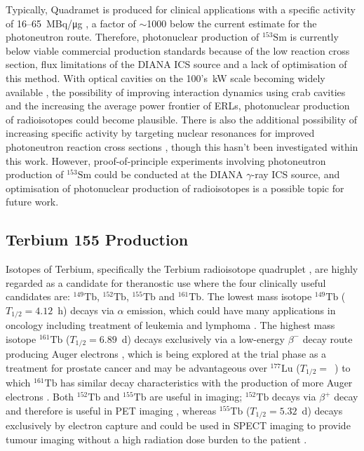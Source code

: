 \documentclass[../main.tex]{subfiles}
\begin{document}
Typically, Quadramet is produced for clinical applications with a specific activity of 16--65~\si{\mega\becquerel}/\si{\micro\gram} \cite{ema2015quadramet}, a factor of $\sim$1000 below the current estimate for the photoneutron route. Therefore, photonuclear production of $^{153}\mathrm{Sm}$ is currently below viable commercial production standards because of the low reaction cross section, flux limitations of the DIANA ICS source and a lack of optimisation of this method. With optical cavities on the 100's~\si{\kilo\watt} scale becoming widely available \cite{eggl2016munich,liu2018optical}, the possibility of improving interaction dynamics using crab cavities \cite{variola2011luminosity,koshiba2018luminosity} and the increasing the average power frontier of ERLs, photonuclear production of radioisotopes could become plausible. There is also the additional possibility of increasing specific activity by targeting nuclear resonances for improved photoneutron reaction cross sections \cite{habs2011production}, though this hasn't been investigated within this work. However, proof-of-principle experiments involving photoneutron production of $^{153}\mathrm{Sm}$ could be conducted at the DIANA $\gamma$-ray ICS source, and optimisation of photonuclear production of radioisotopes is a possible topic for future work.      

\subsection{Terbium 155 Production}
Isotopes of Terbium, specifically the Terbium radioisotope quadruplet \cite{muller2012unique}, are highly regarded as a candidate for theranostic use where the four clinically useful candidates are: $^{149}\mathrm{Tb}$, $^{152}\mathrm{Tb}$, $^{155}\mathrm{Tb}$ and $^{161}\mathrm{Tb}$. The lowest mass isotope $^{149}\mathrm{Tb}$ ($T_{1/2} = 4.12$~\si{\hour}) decays via $\alpha$ emission, which could have many applications in oncology \cite{muller2017alpha} including treatment of leukemia and lymphoma \cite{beyer2004targeted}. The highest mass isotope $^{161}\mathrm{Tb}$ ($T_{1/2} = 6.89$~\si{\day}) decays exclusively via a low-energy $\beta^{-}$ decay route producing Auger electrons \cite{muller2012unique}, which is being explored at the trial phase as a treatment for prostate cancer \cite{baum2021first,muller2019terbium} and may be advantageous over $^{177}\mathrm{Lu}$ ($T_{1/2} = $~\si{}) to which $^{161}\mathrm{Tb}$ has similar decay characteristics with the production of more Auger electrons \cite{lehenberger2011low,grunberg2014anti}. Both $^{152}\mathrm{Tb}$ and $^{155}\mathrm{Tb}$ are useful in imaging; $^{152}\mathrm{Tb}$ decays via $\beta^{+}$ decay and therefore is useful in PET imaging \cite{muller2012unique}, whereas $^{155}\mathrm{Tb}$ ($T_{1/2} = 5.32$~\si{\day}) decays exclusively by electron capture and could be used in SPECT imaging to provide tumour imaging without a high radiation dose burden to the patient \cite{muller2012unique}.
\end{document}
